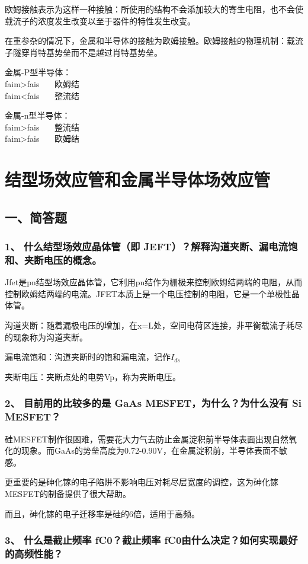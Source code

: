 \documentclass[cn,11pt]{elegantbook}
\begin{document}
欧姆接触表示为这样一种接触：所使用的结构不会添加较大的寄生电阻，也不会使载流子的浓度发生改变以至于器件的特性发生改变。

在重参杂的情况下，金属和半导体的接触为欧姆接触。欧姆接触的物理机制：载流子隧穿肖特基势垒而不是越过肖特基势垒。

金属-P型半导体：\\
faim>fais  \ \ \ 欧姆结\\
faim<fais  \ \ \ 整流结

金属-n型半导体：\\
faim>fais  \ \ \ 整流结\\faim>fais  \ \ \ 欧姆结
\section{结型场效应管和金属半导体场效应管}
\subsection{一、简答题}
\subsubsection*{1、 什么结型场效应晶体管（即 JEFT）？解释沟道夹断、漏电流饱和、夹断电压的概念。}
Jfet是pn结型场效应晶体管，它利用pn结作为栅极来控制欧姆结两端的电阻，从而控制欧姆结两端的电流。JFET本质上是一个电压控制的电阻，它是一个单极性晶体管。

沟道夹断：随着漏极电压的增加，在x=L处，空间电荷区连接，非平衡载流子耗尽的现象称为沟道夹断。

漏电流饱和：沟道夹断时的饱和漏电流，记作$I_{ds}$

夹断电压：夹断点处的电势Vp，称为夹断电压。
\subsubsection*{2、 目前用的比较多的是 GaAs MESFET，为什么？为什么没有 Si MESFET？}

硅MESFET制作很困难，需要花大力气去防止金属淀积前半导体表面出现自然氧化的现象。而GaAs的势垒高度为0.72-0.90V，在金属淀积前，半导体表面不敏感。

更重要的是砷化镓的电子陷阱不影响电压对耗尽层宽度的调控，这为砷化镓MESFET的制备提供了很大帮助。

而且，砷化镓的电子迁移率是硅的6倍，适用于高频。
\subsubsection*{3、 什么是截止频率 fC0？截止频率 fC0由什么决定？如何实现最好的高频性能？}
\end{document}
